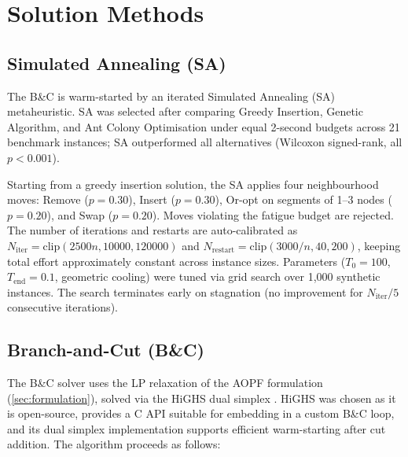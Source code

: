 \documentclass[preprint,11pt]{elsarticle}
\begin{document}
\section{Solution Methods}
\label{sec:methods}

\subsection{Simulated Annealing (SA)}
\label{sec:sa}

The B\&C is warm-started by an iterated Simulated Annealing (SA) metaheuristic.
SA was selected after comparing Greedy Insertion, Genetic Algorithm, and Ant Colony Optimisation under equal 2-second budgets across 21 benchmark instances; SA outperformed all alternatives (Wilcoxon signed-rank, all $p < 0.001$).

Starting from a greedy insertion solution, the SA applies four neighbourhood moves: Remove ($p = 0.30$), Insert ($p = 0.30$), Or-opt on segments of 1--3 nodes ($p = 0.20$), and Swap ($p = 0.20$).
Moves violating the fatigue budget are rejected.
The number of iterations and restarts are auto-calibrated as $N_{\text{iter}} = \text{clip}(2500n, 10000, 120000)$ and $N_{\text{restart}} = \text{clip}(3000/n, 40, 200)$, keeping total effort approximately constant across instance sizes.
Parameters ($T_0 = 100$, $T_{\text{end}} = 0.1$, geometric cooling) were tuned via grid search over 1{,}000 synthetic instances.
The search terminates early on stagnation (no improvement for $N_{\text{iter}}/5$ consecutive iterations).

\subsection{Branch-and-Cut (B\&C)}
\label{sec:bnc}

The B\&C solver uses the LP relaxation of the AOPF formulation (\cref{sec:formulation}), solved via the HiGHS dual simplex \citep{huangfu2018highs}.
HiGHS was chosen as it is open-source, provides a C API suitable for embedding in a custom B\&C loop, and its dual simplex implementation supports efficient warm-starting after cut addition.
The algorithm proceeds as follows:
\end{document}
